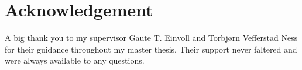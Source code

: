 \documentclass[altfont, fleqn]{uiophd}
\begin{document}

\chapter{Acknowledgement}
A big thank you to my supervisor Gaute T. Einvoll
and Torbj\o rn Vefferstad Ness for their guidance throughout 
my master thesis.
Their support never faltered and were always available 
to any questions. 
\end{document}
